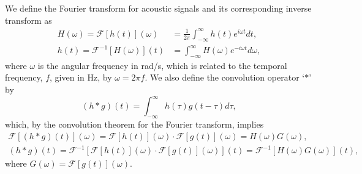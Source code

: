 We define the Fourier transform for acoustic signals and its corresponding inverse transform as
\begin{equation}\label{eq:02_Acoustical_Theory:Fourier_Transform}
\begin{aligned}
H(\omega) = \mathcal{F}\left[ h(t) \right] (\omega) &= \frac{1}{2 \pi} \int_{-\infty}^{\infty} h(t) e^{i \omega t}dt,\\
h(t) = \mathcal{F}^{-1}\left[ H(\omega) \right] (t) &= \int_{-\infty}^{\infty} H(\omega) e^{-i \omega t}d\omega,
\end{aligned}
\end{equation}
where $\omega$ is the angular frequency in rad/s, which is related to the temporal frequency, $f$, given in Hz, by $\omega = 2 \pi f$.
We also define the convolution operator `$\ast$' by
\begin{equation}
(h \ast g)(t) = \int_{-\infty}^{\infty} h(\tau) g(t-\tau) d\tau,
\end{equation}
which, by the convolution theorem for the Fourier transform, implies
\begin{equation}
\begin{gathered}
\mathcal{F}\left[ (h \ast g)(t) \right] (\omega) = \mathcal{F}\left[ h(t) \right] (\omega) \cdot \mathcal{F}\left[ g(t) \right] (\omega) = H(\omega) G(\omega),\\
(h \ast g)(t) = \mathcal{F}^{-1}\left[ \mathcal{F}\left[ h(t) \right] (\omega) \cdot \mathcal{F}\left[ g(t) \right] (\omega) \right] (t) = \mathcal{F}^{-1}\left[ H(\omega) G(\omega) \right] (t),
\end{gathered}
\end{equation}
where $G(\omega) = \mathcal{F}\left[ g(t) \right] (\omega)$.